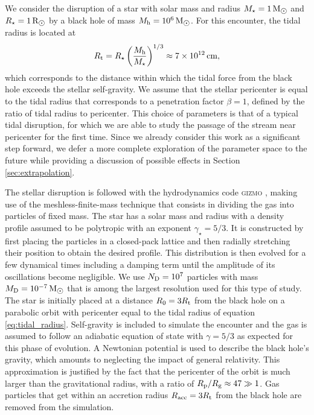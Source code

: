 \documentclass[a4paper,fleqn,usenatbib]{mnras}
\newcommand{\be}{\begin{equation}}
\newcommand{\ee}{\end{equation}}
\newcommand{\mstar}{M_{\star}}
\newcommand{\rstar}{R_{\star}}
\newcommand{\rp}{R_{\rm p}}
\newcommand{\rt}{R_{\rm t}}
\newcommand{\racc}{R_{\rm acc}}
\newcommand{\mh}{M_{\rm h}}
\newcommand{\rg}{R_{\rm g}}
\def\msun{\, \mathrm{M}_{\hbox{$\odot$}}}
\def\rsun{\, \mathrm{R}_{\hbox{$\odot$}}}
\begin{document}
We consider the disruption of a star with solar mass and radius $\mstar = 1 \msun$ and $\rstar = 1 \rsun$ by a black hole of mass $\mh = 10^6 \msun$. For this encounter, the tidal radius is located at 
\be
\rt = \rstar \left(\frac{\mh}{\mstar}\right)^{1/3} \approx 7 \times 10^{12} \, \rm cm,
\label{eq:tidal_radius}
\ee
which corresponds to the distance within which the tidal force from the black hole exceeds the stellar self-gravity. We assume that the stellar pericenter is equal to the tidal radius that corresponds to a penetration factor $\beta = 1$, defined by the ratio of tidal radius to pericenter. This choice of parameters is that of a typical tidal disruption, for which we are able to study the passage of the stream near pericenter for the first time. Since we already consider this work as a significant step forward, we defer a more complete exploration of the parameter space to the future while providing a discussion of possible effects in Section \ref{sec:extrapolation}.


The stellar disruption is followed with the hydrodynamics code \textsc{gizmo} \citep{hopkins2015}, making use of the meshless-finite-mass technique that consists in dividing the gas into particles of fixed mass. The star has a solar mass and radius with a density profile assumed to be polytropic with an exponent $\gamma_{\star} = 5/3$. It is constructed by first placing the particles in a closed-pack lattice and then radially stretching their position to obtain the desired profile. This distribution is then evolved for a few dynamical times including a damping term until the amplitude of its oscillations become negligible. We use $N_{\rm D} = 10^7$ particles with mass $M_{\rm D} = 10^{-7} \msun$ that is among the largest resolution used for this type of study. The star is initially placed at a distance $R_0 = 3 \rt$ from the black hole on a parabolic orbit with pericenter equal to the tidal radius of equation \eqref{eq:tidal_radius}. Self-gravity is included to simulate the encounter and the gas is assumed to follow an adiabatic equation of state with $\gamma = 5/3$ as expected for this phase of evolution. A Newtonian potential is used to describe the black hole's gravity, which amounts to neglecting the impact of general relativity. This approximation is justified by the fact that the pericenter of the orbit is much larger than the gravitational radius, with a ratio of $\rp/\rg \approx 47 \gg 1$. Gas particles that get within an accretion radius $\racc = 3 \rt$ from the black hole are removed from the simulation. 
\end{document}
